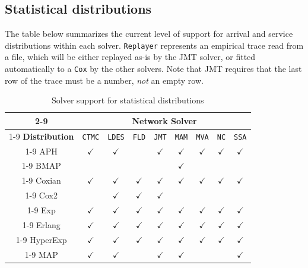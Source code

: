 \subsection{Statistical distributions}
The table below summarizes the current level of support for arrival and service distributions within each solver. \texttt{Replayer} represents an empirical trace read from a file, which will be either replayed as-is by the JMT solver, or fitted automatically to a \texttt{Cox} by the other solvers. Note that JMT requires that the last row of the trace must be a number, {\em not} an empty row.

\begin{table}[ht!]
\renewcommand{\arraystretch}{1.2}
\centering
\caption{Solver support for statistical distributions}
{\small
\begin{tabular}{|c|c|c|c|c|c|c|c|c|}
\cline{2-9}
\multicolumn{1}{c|}{}&\multicolumn{8}{c|}{\textbf{Network Solver}}\\
\cline{1-9}
\textbf{Distribution}	&\texttt{CTMC}&\texttt{LDES}&\texttt{FLD} 	&\texttt{JMT} 	&\texttt{MAM}	&\texttt{MVA}	&\texttt{NC}	&\texttt{SSA}	\\
\cline{1-9}
APH	&	$\checkmark$	&$\checkmark$	& 	&  $\checkmark$	 	&   $\checkmark$		&$\checkmark$	 &	$\checkmark$	&$\checkmark$	   \\
\cline{1-9}
BMAP	&		&	&	&  	&  $\checkmark$	 	&  & &	   \\
\cline{1-9}
Coxian	&$\checkmark$	&$\checkmark$	&$\checkmark$	&  $\checkmark$	 	&  $\checkmark$	 	& $\checkmark$ &$\checkmark$	&$\checkmark$	   \\
\cline{1-9}
Cox2	&	&$\checkmark$	&$\checkmark$	&  $\checkmark$	 	&  	 	&  & &	   \\
\cline{1-9}
Exp	&$\checkmark$	&$\checkmark$	&$\checkmark$	&  $\checkmark$	 	&  $\checkmark$	 	& $\checkmark$ & $\checkmark$	&$\checkmark$	   \\
\cline{1-9}
Erlang	&$\checkmark$	&$\checkmark$	&$\checkmark$	&  $\checkmark$		&  $\checkmark$	   	& $\checkmark$ &$\checkmark$	&$\checkmark$	  \\
\cline{1-9}
HyperExp	&$\checkmark$	&$\checkmark$	&$\checkmark$	&  $\checkmark$		&  $\checkmark$	  	& $\checkmark$ &$\checkmark$&$\checkmark$		  \\
\cline{1-9}
MAP	&	$\checkmark$	&$\checkmark$ &	&  $\checkmark$		&  $\checkmark$	  	&  & &$\checkmark$		  \\

\end{tabular}}
\end{table}
